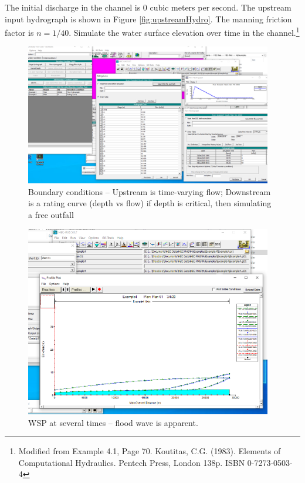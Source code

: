 The initial discharge in the channel is 0 cubic meters per second. 
The upstream input hydrograph is shown in Figure \ref{fig:upstreamHydro}.
The manning friction factor is $n=1/40$.
Simulate the water surface elevation over time in the channel.\footnote{Modified from Example 4.1, Page 70. Koutitas, C.G. (1983). Elements of Computational Hydraulics. Pentech Press, London 138p. ISBN 0-7273-0503-4 }

\begin{figure}[h!] %
   \centering
   \includegraphics[width=4.25in]{ex4bc.png} 
   \caption{Boundary conditions -- Upstream is time-varying flow; Downstream is a rating curve (depth vs flow) if depth is critical, then simulating a free outfall}
   \label{fig:ex5bc}
\end{figure}

\begin{figure}[h!] %
   \centering
   \includegraphics[width=4.25in]{ex4wsp.png} 
   \caption{WSP at several times -- flood wave is apparent.}
   \label{fig:ex5wsp}
\end{figure}

